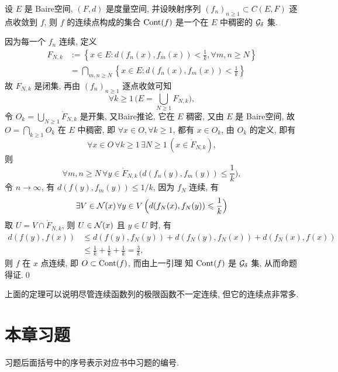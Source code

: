 	\begin{Theorem}
		设 $ E $ 是 Baire空间, $ (F, d) $  是度量空间, 并设映射序列 $ (f_{n})_{n\geqslant1}\subset C(E, F) $ 逐点收敛到 $ f $, 则 $ f $ 的连续点构成的集合 $ \operatorname{Cont}(f) $ 是一个在 $ E $ 中稠密的 $ \mathcal{G}_{\delta} $ 集. 
	\end{Theorem}
	\begin{Proof}
		因为每一个 $ f_{n} $ 连续, 定义
		\[
			\begin{aligned}
				F_{N, k} & :=\left\{ x\in E: d(f_{n}(x), f_{m}(x))<\frac{1}{k}, \forall m, n\geqslant N \right\} \\
				& = \bigcap_{m,n\geqslant N}\left\{ x\in E: d(f_{n}(x), f_{m}(x))<\frac{1}{k} \right\}
			\end{aligned}
		\]
		故 $ F_{N, k} $ 是闭集, 再由 $ (f_{n})_{n\geqslant1} $ 逐点收敛可知
		\[
			\forall k\geqslant1\,\Big(E=\bigcup_{N\geqslant1}F_{N, k}\Big),
		\]
		令 $ O_{k}=\bigcup_{N\geqslant1}\mathring{F}_{N, k} $ 是开集, 又Baire推论, 它在 $ E $ 稠密, 又由 $ E $ 是 Baire空间, 故 $ O=\bigcap_{k\geqslant1}O_{k} $ 在 $ E $ 中稠密, 即 $ \forall x\in O, \forall k\geqslant1 $, 都有 $ x\in O_{k} $, 由 $ O_{k} $ 的定义, 即有
		\[
			\forall x\in O\,\forall k\geqslant1\,\exists N\geqslant1\,(x\in\mathring{F}_{N, k}),
		\]
		则
		\[
			\forall m, n\geqslant N\,\forall y\in\mathring{F}_{N, k}\,\Big(d(f_{n}(y), f_{m}(y))\leqslant\frac{1}{k}\Big),
		\]
		令 $ n\to\infty $, 有 $ d(f(y), f_{m}(y))\leqslant1/k $, 因为 $ f_{N} $ 连续, 有
		\[
			\exists V\in\mathcal{N}(x)\,\forall y\in V\,\Big( d(f_{N}(x), f_{N}(y))\leqslant\frac{1}{k} \Big)
		\]
		取 $ U = V\cap\mathring{F}_{N, k} $, 则 $ U\in\mathcal{N}(x) $ 且 $ y\in U $ 时, 有
		\[
			\begin{aligned}
				d(f(y), f(x)) & \leqslant d(f(y), f_{N}(y))+d(f_{N}(y), f_{N}(x))+d(f_{N}(x), f(x))\\
				& \leqslant \frac{1}{k}+\frac{1}{k}+\frac{1}{k}=\frac{3}{k},
			\end{aligned}
		\]
		则 $ f $ 在 $ x $ 点连续, 即 $ O\subset\operatorname{Cont}(f) $, 而由上一引理 知 $ \operatorname{Cont}(f) $ 是 $ \mathcal{G}_{\delta} $ 集, 从而命题得证.\qed
	\end{Proof}
	上面的定理可以说明尽管连续函数列的极限函数不一定连续, 但它的连续点非常多. 
\section*{本章习题}
	
	习题后面括号中的序号表示对应书中习题的编号.
	
